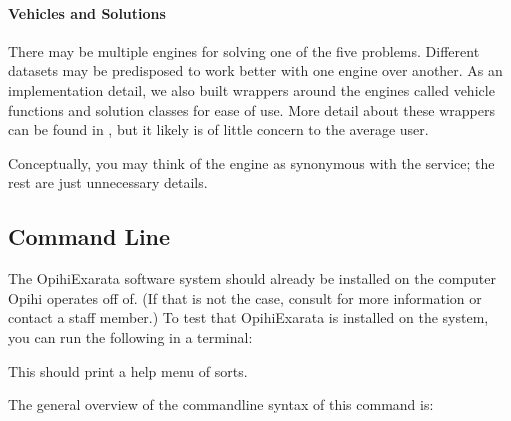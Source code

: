 \documentclass[letterpaper,11pt,english]{sphinxmanual}
\begin{document}
\paragraph{Vehicles and Solutions}
\label{\detokenize{user/system_framework:vehicles-and-solutions}}
\sphinxAtStartPar
There may be multiple engines for solving one of the five problems. Different
datasets may be predisposed to work better with one engine over another. As an
implementation detail, we also built wrappers around the engines called
vehicle functions and solution classes for ease of use. More detail about these
wrappers can be found in {\hyperref[\detokenize{technical/architecture/vehicles_solutions:technical-architecture-vehicles-solutions}]{}}, but
it likely is of little concern to the average user.

\sphinxAtStartPar
Conceptually, you may think of the engine as synonymous with the service; the
rest are just unnecessary details.

\sphinxstepscope


\subsection{Command Line}
\label{\detokenize{user/command_line:command-line}}\label{\detokenize{user/command_line:user-command-line}}\label{\detokenize{user/command_line::doc}}
\sphinxAtStartPar
The OpihiExarata software system should already be installed on the computer
Opihi operates off of. (If that is not the case, consult
{\hyperref[\detokenize{technical/installation/index:technical-installation}]{}} for more information or contact a staff member.)
To test that OpihiExarata is installed on the system, you can run the
following in a terminal:

\begin{sphinxVerbatim}[commandchars=\\\{\}]
\end{sphinxVerbatim}

\sphinxAtStartPar
This should print a help menu of sorts.

\sphinxAtStartPar
The general overview of the command\sphinxhyphen{}line syntax of this command is:

\begin{sphinxVerbatim}[commandchars=\\\{\}]
 \PYG{p}{[}\PYG{p}{]} \PYG{p}{[}\PYG{p}{]}
\end{sphinxVerbatim}
\end{document}
